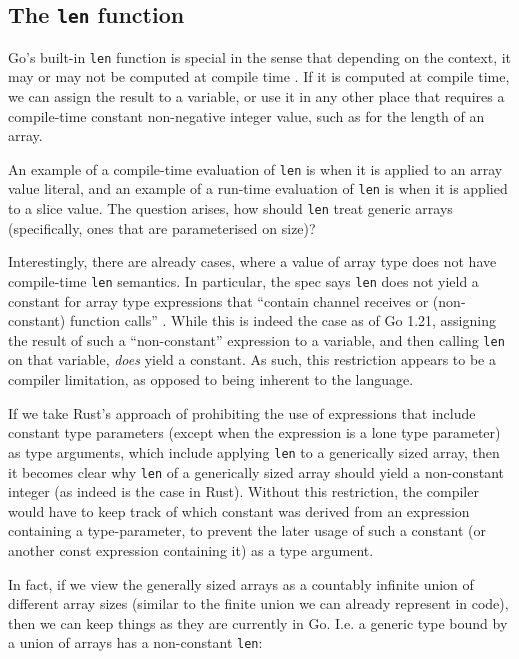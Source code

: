 \subsection{The \texttt{len} function}

Go's built-in \texttt{len} function is special in the sense that depending on
the context, it may or may not be computed at compile time \autocite{spec}. If
it is computed at compile time, we can assign the result to a 
variable, or use it in any other place that requires a compile-time constant
non-negative integer value, such as for the length of an array.

An example of a compile-time evaluation of \texttt{len} is when it is applied to
an array value literal, and an example of a run-time evaluation of \texttt{len}
is when it is applied to a slice value. The question arises, how should
\texttt{len} treat generic arrays (specifically, ones that are parameterised on
size)?

Interestingly, there are already cases, where a value of array type does not
have compile-time \texttt{len} semantics. In particular, the spec says
\texttt{len} does not yield a constant for array type expressions that ``contain
channel receives or (non-constant) function calls'' \autocite{spec}. While this
is indeed the case as of Go 1.21, assigning the result of such a
``non-constant'' expression to a variable, and then calling \texttt{len} on that
variable, \emph{does} yield a constant. As such, this restriction appears to be
a compiler limitation, as opposed to being inherent to the language.

If we take Rust's approach of prohibiting the use of expressions that include
constant type parameters (except when the expression is a lone type parameter)
as type arguments, which include applying \texttt{len} to a generically sized
array, then it becomes clear why \texttt{len} of a generically sized array
should yield a non-constant integer (as indeed is the case in Rust). Without
this restriction, the compiler would have to keep track of which constant was
derived from an expression containing a type-parameter, to prevent the later
usage of such a constant (or another const expression containing it) as a type
argument.


In fact, if we view the generally sized arrays as a countably infinite union of
different array sizes (similar to the finite union we can already represent in
code), then we can keep things as they are currently in Go. I.e. a generic type
bound by a union of arrays has a non-constant \texttt{len}:

